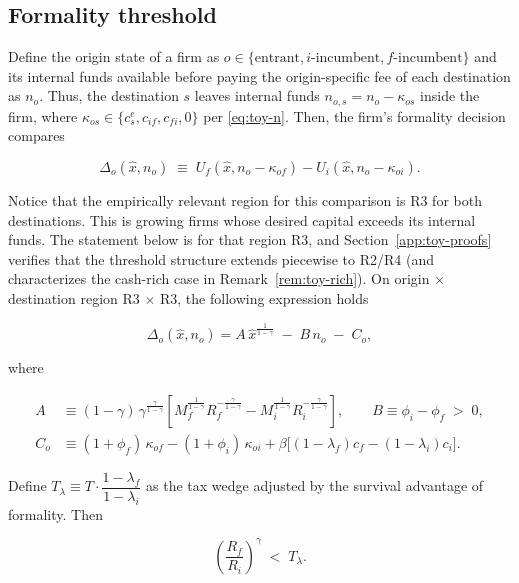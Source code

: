 \documentclass[12pt]{article}
\begin{document}
\subsection{Formality threshold}

Define the origin state of a firm as $o\in\{\text{entrant},i\text{-incumbent}, f\text{-incumbent}\}$ and its internal funds available before paying the origin-specific fee of each destination as $n_{o}$. Thus, the destination $s$ leaves internal funds $n_{o,s}=n_{o}-\kappa_{os}$ inside the firm, where $\kappa_{os}\in\{c^e_{s},c_{i f},c_{f i},0\}$ per \eqref{eq:toy-n}. Then, the firm's formality decision compares

\begin{equation}
  \Delta_{o}(\hat x,n_{o}) \;\equiv\;
  U_{f}(\hat x,n_{o}-\kappa_{of})
  -U_{i}(\hat x,n_{o}-\kappa_{oi}) .
\end{equation}

Notice that the empirically relevant region for this comparison is R3 for both destinations. This is growing firms whose desired capital exceeds its internal funds. The statement below is for that region R3, and Section~\ref{app:toy-proofs} verifies that the threshold structure extends piecewise to R2/R4 (and characterizes the cash-rich case in Remark~\ref{rem:toy-rich}). On origin $\times$ destination region R3 $\times$ R3, the following expression holds
 
\begin{equation}
  \Delta_{o}(\hat x,n_{o})
  = A\,\hat x^{\frac{1}{1-\gamma}}
  \;-\; B\,n_{o} \;-\; C_{o},
  \label{eq:toy-Delta-affine}
\end{equation}

where 

\begin{align}
  A &\equiv (1-\gamma)\,\gamma^{\frac{\gamma}{1-\gamma}}
      \left[ M_{f}^{\frac{1}{1-\gamma}}R_{f}^{-\frac{\gamma}{1-\gamma}}
           - M_{i}^{\frac{1}{1-\gamma}}R_{i}^{-\frac{\gamma}{1-\gamma}}
      \right],
  \qquad
  B \equiv \phi_{i}-\phi_{f} \;>\;0,
  \label{eq:toy-AB}\\[2pt]
  C_{o} &\equiv (1+\phi_{f})\,\kappa_{of}
        - (1+\phi_{i})\,\kappa_{oi}
        + \beta\big[(1-\lambda_{f})c_{f}
                   -(1-\lambda_{i})c_{i}\big] .
  \label{eq:toy-C}
\end{align}
 
\begin{assumption}
\label{ass:A1}
Define $T_{\lambda}\equiv T\cdot\dfrac{1-\lambda_{f}}{1-\lambda_{i}}$ as the tax wedge adjusted by the survival advantage of formality. Then

\begin{equation}
  \left(\frac{R_{f}}{R_{i}}\right)^{\gamma}
  \;<\; T_{\lambda} .
  \label{eq:toy-A1}
\end{equation}
\end{assumption}
 
\end{document}
